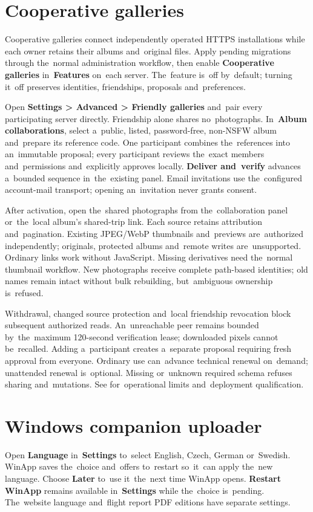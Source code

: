 \documentclass[11pt,a4paper]{article}
\newcommand{\filepath}[1]{\path{#1}}
\newcommand{\ui}[1]{\textbf{#1}}
\begin{document}
\section{Cooperative galleries}
Cooperative galleries connect independently operated HTTPS installations while
each owner retains their albums and~original files. Apply pending migrations
through the~normal administration workflow, then enable \ui{Cooperative
galleries} in~\ui{Features} on~each server. The~feature is~off by~default;
turning it~off preserves identities, friendships, proposals and~preferences.

Open \ui{Settings > Advanced > Friendly galleries} and~pair every participating
server directly. Friendship alone shares no~photographs. In~\ui{Album
collaborations}, select a~public, listed, password-free, non-NSFW album
and~prepare its reference code. One participant combines the~references into
an~immutable proposal; every participant reviews the~exact members
and~permissions and~explicitly approves locally. \ui{Deliver and~verify}
advances a~bounded sequence in~the~existing panel. Email invitations use
the~configured account-mail transport; opening an~invitation never grants
consent.

After activation, open the~shared photographs from the~collaboration panel
or~the~local album's shared-trip link. Each source retains attribution
and~pagination. Existing JPEG/WebP thumbnails and~previews are~authorized
independently; originals, protected albums and~remote writes are~unsupported.
Ordinary links work without JavaScript. Missing derivatives need the~normal
thumbnail workflow. New photographs receive complete path-based identities; old
names remain intact without bulk rebuilding, but~ambiguous ownership is~refused.

Withdrawal, changed source protection and~local friendship revocation block
subsequent authorized reads. An~unreachable peer remains bounded by~the~maximum
120-second verification lease; downloaded pixels cannot be~recalled. Adding
a~participant creates a~separate proposal requiring fresh approval from
everyone. Ordinary use can~advance technical renewal on~demand; unattended
renewal is~optional. Missing or~unknown required schema refuses sharing
and~mutations. See \filepath{docs/COOPERATIVE_GALLERIES.md} for~operational
limits and~deployment qualification.

\section{Windows companion uploader}
Open \ui{Language} in~\ui{Settings} to~select English, Czech, German or~Swedish.
WinApp saves the~choice and~offers to~restart so~it~can apply the~new language.
Choose \ui{Later} to~use it~the~next time WinApp opens.
\ui{Restart WinApp} remains available in~\ui{Settings} while the~choice is~pending.
The~website language and~flight report PDF editions have separate settings.
\end{document}
